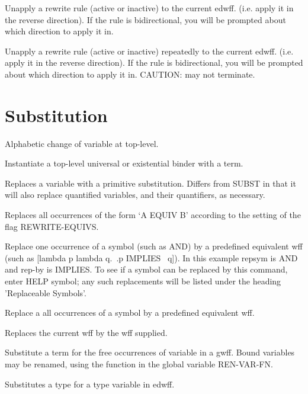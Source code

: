 \begin{description}
\item[UNARR1]  
Unapply a rewrite rule (active or inactive) to the current 
edwff. (i.e. apply it in the reverse direction).
If the rule is bidirectional, you will be prompted about
which direction to apply it in.

\item[UNARR1*]  
Unapply a rewrite rule (active or inactive) repeatedly to 
the current edwff. (i.e. apply it in the reverse direction).
If the rule is bidirectional, you will be prompted about
which direction to apply it in.
CAUTION: may not terminate.
\item
\end{description}

\section{Substitution}

\begin{description} 
\item[AB]  
Alphabetic change of variable at top-level.

\item[IB]  
Instantiate a top-level universal or existential binder with a term.

\item[PRIM-SUBST]  
Replaces a variable with a primitive substitution.
Differs from SUBST in that it will also replace quantified
variables, and their quantifiers, as necessary.

\item[REW-EQUIV]  
Replaces all occurrences of the form `A EQUIV B'
according to the setting of the flag REWRITE-EQUIVS.

\item[RP]  
Replace one occurrence of a symbol (such as AND) by a predefined 
equivalent wff (such as [lambda p lambda q.~.p IMPLIES ~q]).  In this
example repsym is AND and rep-by is IMPLIES.  To see if a symbol can be
replaced by this command, enter HELP symbol; any such replacements will be
listed under the heading 'Replaceable Symbols'.

\item[RPALL]  
Replace a all occurrences of a symbol by a predefined equivalent wff.

\item[SUB]  
Replaces the current wff by the wff supplied.

\item[SUBST]  
Substitute a term for the free occurrences of variable in a gwff.
Bound variables may be renamed, using the function in the global
variable REN-VAR-FN.

\item[SUBSTYP]  
Substitutes a type for a type variable in edwff.
\item
\end{description}

